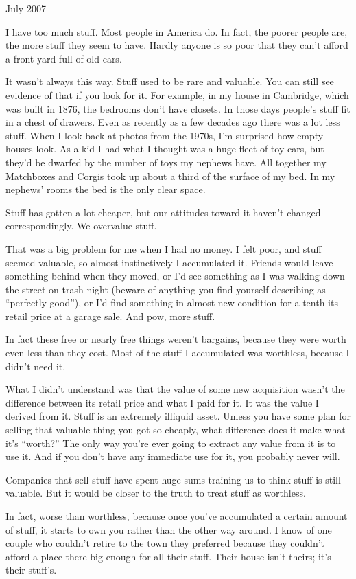 July 2007

I have too much stuff. Most people in America do. In fact, the poorer
people are, the more stuff they seem to have. Hardly anyone is so poor
that they can't afford a front yard full of old cars.

It wasn't always this way. Stuff used to be rare and valuable. You can
still see evidence of that if you look for it. For example, in my house
in Cambridge, which was built in 1876, the bedrooms don't have closets.
In those days people's stuff fit in a chest of drawers. Even as recently
as a few decades ago there was a lot less stuff. When I look back at
photos from the 1970s, I'm surprised how empty houses look. As a kid I
had what I thought was a huge fleet of toy cars, but they'd be dwarfed
by the number of toys my nephews have. All together my Matchboxes and
Corgis took up about a third of the surface of my bed. In my nephews'
rooms the bed is the only clear space.

Stuff has gotten a lot cheaper, but our attitudes toward it haven't
changed correspondingly. We overvalue stuff.

That was a big problem for me when I had no money. I felt poor, and
stuff seemed valuable, so almost instinctively I accumulated it. Friends
would leave something behind when they moved, or I'd see something as I
was walking down the street on trash night (beware of anything you find
yourself describing as ``perfectly good''), or I'd find something in
almost new condition for a tenth its retail price at a garage sale. And
pow, more stuff.

In fact these free or nearly free things weren't bargains, because they
were worth even less than they cost. Most of the stuff I accumulated was
worthless, because I didn't need it.

What I didn't understand was that the value of some new acquisition
wasn't the difference between its retail price and what I paid for it.
It was the value I derived from it. Stuff is an extremely illiquid
asset. Unless you have some plan for selling that valuable thing you got
so cheaply, what difference does it make what it's ``worth?'' The only
way you're ever going to extract any value from it is to use it. And if
you don't have any immediate use for it, you probably never will.

Companies that sell stuff have spent huge sums training us to think
stuff is still valuable. But it would be closer to the truth to treat
stuff as worthless.

In fact, worse than worthless, because once you've accumulated a certain
amount of stuff, it starts to own you rather than the other way around.
I know of one couple who couldn't retire to the town they preferred
because they couldn't afford a place there big enough for all their
stuff. Their house isn't theirs; it's their stuff's.


